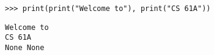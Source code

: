 \question \begin{lstlisting}
>>> print(print("Welcome to"), print("CS 61A"))
\end{lstlisting}

\begin{solution}[0.5in]
\begin{verbatim}
Welcome to
CS 61A
None None
\end{verbatim}
\end{solution}
